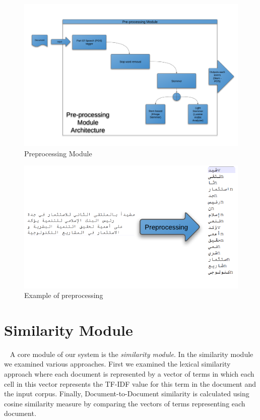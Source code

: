 \begin{figure}[htb]
\begin{center}
\includegraphics[totalheight=1\textheight,
width=1\textwidth]{./Figures/arch_2.png}
\end{center}
\caption{Preprocessing Module}
\label{fig:arch_2}
\end{figure}


\begin{figure}[htb]
\begin{center}
\includegraphics[totalheight=.75\textheight,
width=.75\textwidth]{./Figures/arch_3.png}
\end{center}
\caption{Example of preprocessing}
\label{fig:arch_3}
\end{figure}

\section{Similarity Module}~\label{sec:similarity}
A core module of our system is the \textit{similarity module}. In the similarity module we examined various approaches. First we examined the lexical similarity approach where each document is represented by a vector of terms in which each cell in this vector represents the TF-IDF value for this term in the document and the input corpus. 
Finally, Document-to-Document similarity is calculated using cosine similarity measure by comparing the vectors of terms representing each document.

